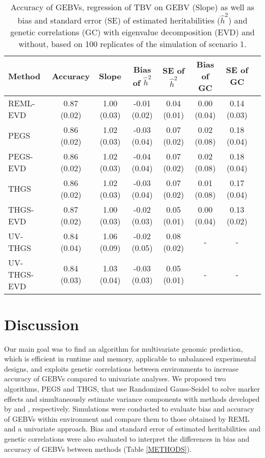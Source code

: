 \documentclass{bmcart}
\begin{document}
\begin{table}[ht]
\centering
\renewcommand*{\arraystretch}{1.2}
\caption{Accuracy of GEBVs, regression of TBV on GEBV (Slope) as well as bias and standard error (SE) of estimated heritabilities ($\hat{h}^2$) and genetic correlations (GC) with eigenvalue decomposition (EVD) and without, based on 100 replicates of the simulation of scenario 1.}\smallskip
\begin{tabular}{l c c c c c c c }
\hline
Method & Accuracy & Slope  & Bias of $\hat{h}^2$ & SE of $\hat{h}^2$ & Bias of GC & SE of GC   \\
\hline
REML-EVD & 0.87 (0.02) & 1.00 (0.03) & -0.01 (0.02) & 0.04 (0.01) & 0.00 (0.04) & 0.14 (0.03) \\
PEGS & 0.86 (0.02) & 1.02 (0.03) & -0.03 (0.04) & 0.07 (0.02) & 0.02 (0.08) & 0.18 (0.04) \\
PEGS-EVD & 0.86 (0.02) & 1.02 (0.03) & -0.04 (0.04) & 0.07 (0.02) & 0.02 (0.08) & 0.18 (0.04) \\
THGS & 0.86 (0.02) & 1.02 (0.03) & -0.03 (0.04) & 0.07 (0.02) & 0.01 (0.08) & 0.17 (0.04) \\
THGS-EVD & 0.87 (0.02) & 1.00 (0.03) & -0.02 (0.03) & 0.05 (0.01) & 0.00 (0.04) & 0.13 (0.02) \\
UV-THGS & 0.84 (0.04) & 1.06 (0.09) & -0.02 (0.05) & 0.08 (0.02) & - & - \\
UV-THGS-EVD & 0.84 (0.03) & 1.03 (0.04) & -0.03 (0.03) & 0.05 (0.01) & - & - \\
\hline
\end{tabular}
\label{ExTH}
\end{table}


\section{Discussion}

Our main goal was to find an algorithm for multivariate genomic prediction, which is efficient in runtime and memory, applicable to unbalanced experimental designs, and exploits genetic correlations between environments to increase accuracy of GEBVs compared to univariate analyses. We proposed two algorithms, PEGS and THGS, that use Randomized Gauss-Seidel to solve marker effects and simultaneously estimate variance components with methods developed by \cite{Schaeffer} and \cite{VanRaden}, respectively. Simulations were conducted to evaluate bias and accuracy of GEBVs within environment and compare them to those obtained by REML and a univariate approach. Bias and standard error of estimated heritabilities and genetic correlations were also evaluated to interpret the differences in bias and accuracy of GEBVs between methods (Table \ref{METHODS}).
\end{document}
